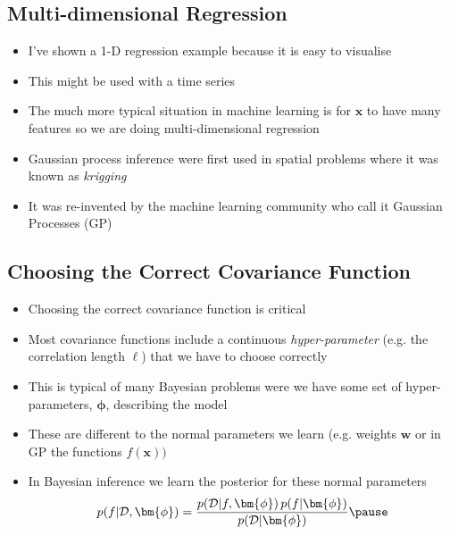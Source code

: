 \begin{slide}
\section{Multi-dimensional Regression}

\begin{PauseHighLight}
  \begin{itemize}
  \item I've shown a 1-D regression example because it is easy to
    visualise\pause
  \item This might be used with a time series\pause
  \item The much more typical situation in machine learning is for
    $\bm{x}$ to have many features so we are doing multi-dimensional
    regression\pause
  \item Gaussian process inference were first used in spatial problems
    where it was known as \emph{krigging}\pause
  \item It was re-invented by the machine learning community who call it
    Gaussian Processes (GP)\pause
  \end{itemize}
\end{PauseHighLight}

\end{slide}


\Outline %

\begin{slide}
\section[-2]{Choosing the Correct Covariance Function}

\begin{PauseHighLight}
  \begin{itemize}
  \item Choosing the correct covariance function is critical\pause
  \item Most covariance functions include a continuous
    \emph{hyper-parameter} (e.g. the correlation length $\ell$) that we
    have to choose correctly\pause
  \item This is typical of many Bayesian problems were we have some set
    of hyper-parameters, $\bm{\phi}$, describing the model\pause
  \item These are different to the normal parameters we learn
    (e.g. weights $\bm{w}$ or in GP the functions $f(\bm{x}))$\pause
  \item In Bayesian inference we learn the posterior for these normal
    parameters 
    \begin{align*}
      p(f|\mathcal{D},\bm{\phi}) =
      \frac{p(\mathcal{D}| f, \bm{\phi})\, p(f|\bm{\phi})}
      {p(\mathcal{D}|\bm{\phi})}\pause
    \end{align*}
  \end{itemize}
\end{PauseHighLight}

\end{slide}

